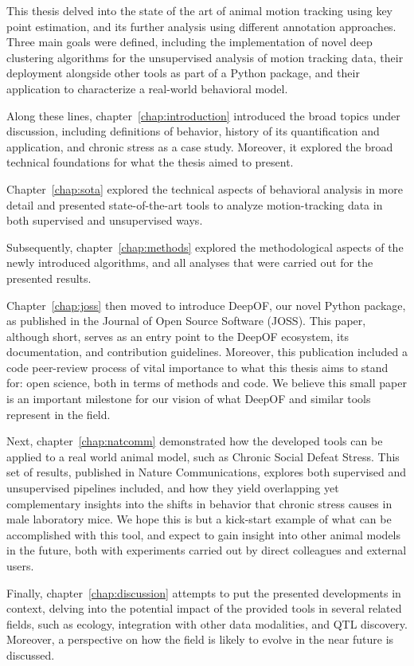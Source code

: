 This thesis delved into the state of the art of animal motion tracking using key point estimation, and its further analysis using different annotation approaches. Three main goals were defined, including the implementation of novel deep clustering algorithms for the unsupervised analysis of motion tracking data, their deployment alongside other tools as part of a Python package, and their application to characterize a real-world behavioral model.

Along these lines, chapter~\ref{chap:introduction} introduced the broad topics under discussion, including definitions of behavior, history of its quantification and application, and chronic stress as a case study. Moreover, it explored the broad technical foundations for what the thesis aimed to present. 

Chapter~\ref{chap:sota} explored the technical aspects of behavioral analysis in more detail and presented state-of-the-art tools to analyze motion-tracking data in both supervised and unsupervised ways. 

Subsequently, chapter~\ref{chap:methods} explored the methodological aspects of the newly introduced algorithms, and all analyses that were carried out for the presented results. 

Chapter~\ref{chap:joss} then moved to introduce DeepOF, our novel Python package, as published in the Journal of Open Source Software (JOSS). This paper, although short, serves as an entry point to the DeepOF ecosystem, its documentation, and contribution guidelines. Moreover, this publication included a code peer-review process of vital importance to what this thesis aims to stand for: open science, both in terms of methods and code. We believe this small paper is an important milestone for our vision of what DeepOF and similar tools represent in the field. 

Next, chapter~\ref{chap:natcomm} demonstrated how the developed tools can be applied to a real world animal model, such as Chronic Social Defeat Stress. This set of results, published in Nature Communications, explores both supervised and unsupervised pipelines included, and how they yield overlapping yet complementary insights into the shifts in behavior that chronic stress causes in male laboratory mice. We hope this is but a kick-start example of what can be accomplished with this tool, and expect to gain insight into other animal models in the future, both with experiments carried out by direct colleagues and external users.

Finally, chapter~\ref{chap:discussion} attempts to put the presented developments in context, delving into the potential impact of the provided tools in several related fields, such as ecology, integration with other data modalities, and QTL discovery. Moreover, a perspective on how the field is likely to evolve in the near future is discussed.

